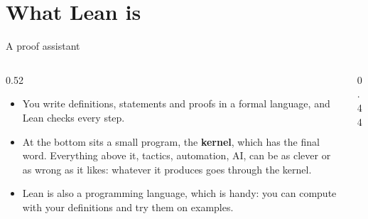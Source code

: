 \documentclass[10pt, aspectratio=169]{beamer}
\begin{document}
\section{What Lean is}

\begin{frame}[fragile]{A proof assistant}
\begin{columns}[c]
\begin{column}{0.52\textwidth}
\begin{itemize}
\item You write definitions, statements and proofs in a formal language, and Lean checks every step.
\item At the bottom sits a small program, the \textbf{kernel}, which has the final word. Everything above it, tactics, automation, AI, can be as clever or as wrong as it likes: whatever it produces goes through the kernel.
\item Lean is also a programming language, which is handy: you can compute with your definitions and try them on examples.
\end{itemize}
\end{column}
\begin{column}{0.44\textwidth}
\centering
{}
\end{column}
\end{columns}
\end{frame}
\end{document}
